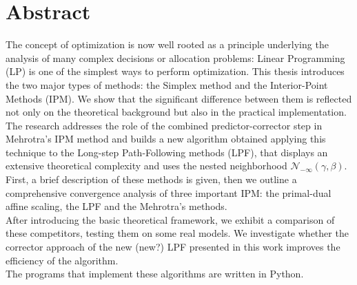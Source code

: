 \documentclass[a4paper,10 pt,titlepage,twoside]{book}
\theoremstyle{plain}
\theoremstyle{definition}
\theoremstyle{remark}
\begin{document}
\chapter*{Abstract}
The concept of optimization is now well rooted as a principle underlying the analysis
of many complex decisions or allocation problems: Linear Programming (LP) is one of the simplest ways to perform optimization.
This thesis introduces the two major types of methods: the Simplex method and the Interior-Point Methods (IPM).
We show that the significant difference between them is reflected not only on the theoretical background but also in the practical implementation.\\
The research addresses the role of the combined predictor-corrector step in Mehrotra's IPM method and builds  a new algorithm obtained applying this technique to the Long-step Path-Following methods (LPF), that displays an extensive theoretical complexity and uses the nested neighborhood $\mathcal{N}_{-\infty}(\gamma,\beta)$.\\
First, a brief description of these methods is given,
then we outline a comprehensive convergence analysis of three important IPM: the primal-dual affine scaling, the LPF and the Mehrotra's methods. \\
After introducing the basic theoretical framework, we exhibit a comparison of these competitors, testing them on some real models. We investigate whether the corrector approach of the new (new?) LPF presented in this work improves the efficiency of the algorithm.\\
The programs that implement these algorithms are written in Python. 
\end{document}
